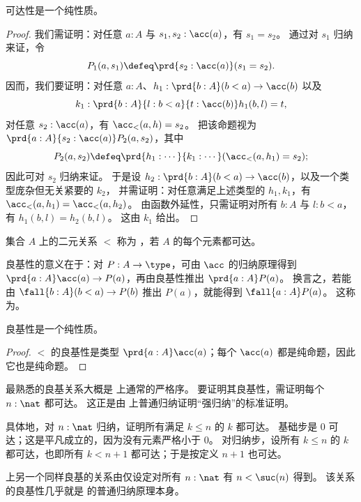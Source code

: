 \begin{lem}
  可达性是一个纯性质。
\end{lem}
\begin{proof}
  我们需证明：对任意 $a:A$ 与 $s_1,s_2:\acc(a)$，有 $s_1=s_2$。
  通过对 $s_1$ 归纳来证，令
  \[P_1(a,s_1) \defeq \prd{s_2:\acc(a)} (s_1=s_2). \]
  因而，我们要证明：对任意 $a:A$、${h_1:\prd{b:A} (b<a) \to \acc(b)}$ 以及
  \[ k_1:{\prd{b:A}{l:b<a}{t:\acc(b)} h_1(b,l) = t},\]
  对任意 $s_2:\acc(a)$，有 $\acc_<(a,h) = s_2$。
  把该命题视为 $\prd{a:A}{s_2:\acc(a)} P_2(a,s_2)$，其中
  \[P_2(a,s_2) \defeq
  \prd{h_1 : \cdots } %
  {k_1 : \cdots} %
  (\acc_<(a,h_1) = s_2);
  \]
  因此可对 $s_2$ 归纳来证。
  于是设 $h_2 : \prd{b:A} (b<a) \to \acc(b)$，以及一个类型庞杂但无关紧要的 $k_2$，
  并需证明：对任意满足上述类型的 $h_1,k_1$，有
  $\acc_<(a,h_1) = \acc_<(a,h_2)$。
  由函数外延性，只需证明对所有 $b:A$ 与 $l:b<a$，有 $h_1(b,l) = h_2(b,l)$。
  这由 $k_1$ 给出。
\end{proof}

\begin{defn}
  集合 $A$ 上的二元关系 $<$ 称为
  ，若 $A$ 的每个元素都可达。
\end{defn}

良基性的意义在于：对 $P:A\to \type$，可由 $\acc$ 的归纳原理得到 $\prd{a:A} \acc(a) \to P(a)$，再由良基性推出 $\prd{a:A} P(a)$。
换言之，若能由 $\fall{b:A} (b<a) \to P(b)$ 推出 $P(a)$，就能得到 $\fall{a:A} P(a)$。
这称为。

\begin{lem}
  良基性是一个纯性质。
\end{lem}
\begin{proof}
  $<$ 的良基性是类型 $\prd{a:A} \acc(a)$；每个 $\acc(a)$ 都是纯命题，因此它也是纯命题。
\end{proof}

\begin{eg}\label{thm:nat-wf}
  最熟悉的良基关系大概是 \nat 上通常的严格序。
  要证明其良基性，需证明每个 $n:\nat$ 都可达。
  这正是由 \nat 上普通归纳证明“强归纳”的标准证明。

  具体地，对 $n:\nat$ 归纳，证明所有满足 $k\le n$ 的 $k$ 都可达。
  基础步是 $0$ 可达；这是平凡成立的，因为没有元素严格小于 $0$。
  对归纳步，设所有 $k\le n$ 的 $k$ 都可达，也即所有 $k<n+1$ 都可达；于是按定义 $n+1$ 也可达。

  \nat 上另一个同样良基的关系由仅设定对所有 $n:\nat$ 有 $n < \suc(n)$ 得到。
  该关系的良基性几乎就是 \nat 的普通归纳原理本身。
\end{eg}

